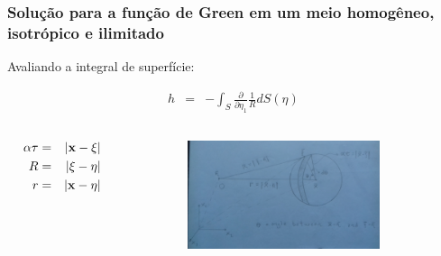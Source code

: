 \documentclass[xcolor=table]{beamer}
\newcommand{\xvec}{\mathbf{x}}
\newcommand{\xivec}{\boldmath \xi}
\begin{document}
\begin{frame}
\frametitle{\textbf{Solu\c{c}\~ao para a fun\c{c}\~ao de Green em um meio homog\^eneo, isotr\'opico e ilimitado}}

\begin{flushleft}
    Avaliando a integral de superf\'icie:
\end{flushleft}
\begin{eqnarray}
  \label{ten1}
   h &=& - \int_{S}\frac{\partial }{\partial \eta_{1}} \frac{1}{R} dS(\eta) \, 
\end{eqnarray}

  \begin{columns}        
  \begin{column}{0.15\textwidth}  
  \begin{eqnarray*}
   \alpha\tau &=& \left| \xvec - \xivec \right|\\
   R &=& \left| \xivec -\eta \right|\\
   r &=&  \left| \xvec - \eta \right|
  \end{eqnarray*}
  \end{column}
  \begin{column}{0.75\textwidth}    
  \begin{figure}[h!]   
    \includegraphics[width=248px, height=120px]{Figura/Fig11.jpg}     
  \end{figure}
  \end{column}
\end{columns}

\end{frame}%
\end{document}
